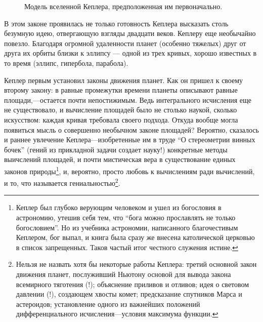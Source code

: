 \documentclass[twocolumn,10pt]{article}
\begin{document}
\begin{figure}[ht]
\begin{center}
\end{center}
\caption{Модель вселенной Кеплера, предположенная им первоначально.}
\end{figure}

В этом законе проявилась не только готовность Кеплера высказать столь безумную идею, отвергающую взгляды двадцати веков. Кеплеру еще необычайно повезло. Благодаря огромной удаленности планет (особенно тяжелых) друг от друга их орбиты близки к эллипсу --- одной из трех кривых, хорошо известных в то время (эллипс, гипербола, парабола).

Кеплер первым установил законы движения планет. Как он пришел к своему второму закону: в равные промежутки времени планеты описывают равные площади,---остается почти непостижимым. Ведь интегрального исчисления еще не существовало, и вычисление площадей было не столько наукой, сколько искусством: каждая кривая требовала своего подхода. Откуда вообще могла появиться мысль о совершенно необычном законе площадей? Вероятно, сказалось и раннее увлечение Кеплера---изобретенные им в труде ``О стереометрии винных бочек'' (гений из прикладной задачи создает науку!) конкретные методы выичслений площадей, и почти мистическая вера в существование единых законов природы\footnote{Кеплер был глубоко верующим человеком и ушел из богословия в астрономию, утешив себя тем, что ``бога можно прославлять не только богословием''. Но из учебника астрономии, написанного благочестивым Кеплером, бог выпал, и книга была сразу же внесена католической церковью в список запрещенных. Таков частый итог честного служения истине.}, и, вероятно, просто любовь к вычислениям ради вычислений, и то, что называется гениальностью\footnote{Нельзя не назвать хотя бы некоторые работы Кеплера: третий основной закон движения планет, послуживший Ньютону основой для вывода закона всемирного тяготения (!); объяснение приливов и отливов; идея о световом давлении (!), создающем хвосты комет; предсказание спутников Марса и астероидов; установление одного из важнейших положений дифференциального исчисления---условия максимума функции.}.
\end{document}
